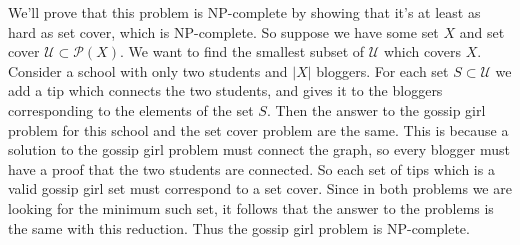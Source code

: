 \documentclass[11pt,letterpaper]{article}
\begin{document}
\begin{solution}
    We'll prove that this problem is NP-complete by showing that it's at least as hard as set cover, which is NP-complete. So suppose we have some set $X$ and set cover $\mathcal{U}\subset \mathcal{P}(X)$. We want to find the smallest subset of $\mathcal{U}$ which covers $X$. Consider a school with only two students and $|X|$ bloggers. For each set $S\subset \mathcal{U}$ we add a tip which connects the two students, and gives it to the bloggers corresponding to the elements of the set $S$. Then the answer to the gossip girl problem for this school and the set cover problem are the same. This is because a solution to the gossip girl problem must connect the graph, so every blogger must have a proof that the two students are connected. So each set of tips which is a valid gossip girl set must correspond to a set cover. Since in both problems we are looking for the minimum such set, it follows that the answer to the problems is the same with this reduction. Thus the gossip girl problem is NP-complete.
\end{solution}
\end{document}

